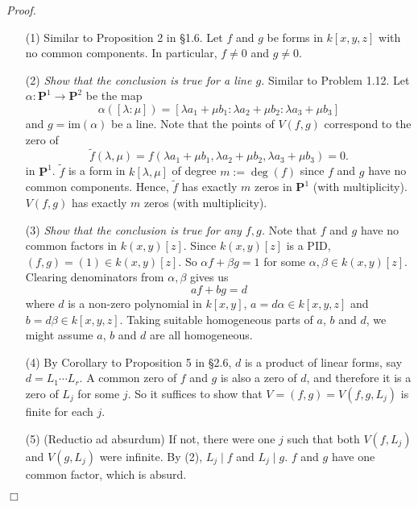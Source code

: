 \documentclass{article}
\begin{document}
\emph{Proof.}
\begin{enumerate}
\item[(1)]
  Similar to Proposition 2 in \S 1.6.
  Let $f$ and $g$ be forms in $k[x,y,z]$ with no common components.
  In particular, $f \neq 0$ and $g \neq 0$.

\item[(2)]
  \emph{Show that the conclusion is true for a line $g$.}
  Similar to Problem 1.12.
  Let
  $\alpha: \mathbf{P}^1 \to \mathbf{P}^2$ be the map
  \[
    \alpha([\lambda : \mu]) = [\lambda a_1 + \mu b_1 : \lambda a_2 + \mu b_2 : \lambda a_3 + \mu b_3]
  \]
  and $g = \mathrm{im}(\alpha)$ be a line.
  Note that the points of $V(f, g)$ correspond to the zero of
  \[
    \widetilde{f}(\lambda, \mu)
    = f(\lambda a_1 + \mu b_1, \lambda a_2 + \mu b_2, \lambda a_3 + \mu b_3)
    = 0.
  \]
  in $\mathbf{P}^1$.
  $\widetilde{f}$ is a form in $k[\lambda,\mu]$ of degree $m := \deg(f)$
  since $f$ and $g$ have no common components.
  Hence, $\widetilde{f}$ has exactly $m$ zeros in $\mathbf{P}^1$ (with multiplicity).
  $V(f,g)$ has exactly $m$ zeros (with multiplicity).

\item[(3)]
  \emph{Show that the conclusion is true for any $f, g$.}
  Note that $f$ and $g$ have no common factors in $k(x,y)[z]$.
  Since $k(x,y)[z]$ is a PID, $(f,g) = (1) \in k(x,y)[z]$.
  So $\alpha f + \beta g = 1$ for some $\alpha, \beta \in k(x,y)[z]$.
  Clearing denominators from $\alpha, \beta$ gives us
  \[
    af + bg = d
  \]
  where $d$ is a non-zero polynomial in $k[x,y]$,
  $a = d\alpha \in k[x,y,z]$ and $b = d\beta \in k[x,y,z]$.
  Taking suitable homogeneous parts of $a$, $b$ and $d$,
  we might assume $a$, $b$ and $d$ are all homogeneous.

\item[(4)]
  By Corollary to Proposition 5 in \S 2.6,
  $d$ is a product of linear forms, say $d = L_1 \cdots L_r$.
  A common zero of $f$ and $g$ is also a zero of $d$,
  and therefore it is a zero of $L_j$ for some $j$.
  So it suffices to show that $V = (f,g) = V(f,g,L_j)$ is finite for each $j$.

\item[(5)]
  (Reductio ad absurdum)
  If not, there were one $j$ such that both $V(f,L_j)$ and $V(g,L_j)$ were infinite.
  By (2), $L_j \mid f$ and $L_j \mid g$.
  $f$ and $g$ have one common factor, which is absurd.
\end{enumerate}
$\Box$ \\\\
\end{document}
